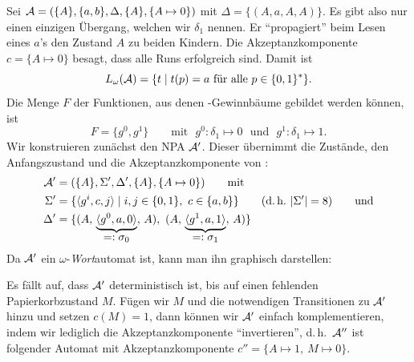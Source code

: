 \documentclass[fontsize=11pt, twoside=false, numbers=autoenddot]{scrbook}
\begin{document}
Sei $\mathcal{A} = (\{A\}, \{a,b\}, \Delta, \{A\}, \{A \mapsto 0\})$
mit $\Delta = \{(A,a,A,A)\}$. Es gibt also nur einen einzigen Übergang,
welchen wir $\delta_1$ nennen. Er "`propagiert"' beim Lesen eines $a$'s
den Zustand $A$ zu beiden Kindern.
Die Akzeptanzkomponente $c = \{A \mapsto 0\}$
besagt, dass alle Runs erfolgreich sind.
Damit ist
\[
  L_\omega(\mathcal{A}) = \{t \mid t(p)=a \text{~für alle~} p \in \{0,1\}^*\}.
\]
Die Menge $F$ der Funktionen, aus denen \PF-Gewinnbäume gebildet werden können,
ist
\[
  F = \{g^0,g^1\}\qquad
  \text{mit~~} g^0 : \delta_1 \mapsto 0
  \text{~~und~~} g^1 : \delta_1 \mapsto 1.
\]
%
Wir konstruieren zunächst den NPA $\mathcal{A}'$. Dieser übernimmt die Zustände, den Anfangszustand
und die Akzeptanzkomponente von \Amc:
%
\begin{align*}
  \mathcal{A}'   & = (\{A\}, \Sigma', \Delta', \{A\}, \{A \mapsto 0\}) \qquad\text{mit} \\
  \Sigma' & = \{\langle g^i, c, j\rangle \mid i,j \in \{0,1\},~ c \in \{a,b\}\}\qquad \text{(d.\,h.\ $|\Sigma'|=8$)}\qquad \text{und} \\
  \Delta' & = \{(A,\,\underbrace{\langle g^0,a,0\rangle}_{\text{{\normalsize $=: \sigma_0$}}},\,A),~ 
                (A,\,\underbrace{\langle g^1,a,1\rangle}_{\text{{\normalsize $=: \sigma_1$}}},\,A)\}
\end{align*}
%
Da $\mathcal{A}'$ ein $\omega$-\emph{Wort}automat ist, kann man ihn graphisch darstellen:
%
\begin{center}
\end{center}
%
Es fällt auf, dass $\mathcal{A}'$ deterministisch ist, bis auf einen fehlenden Papierkorbzustand $M$.
Fügen wir $M$ und die notwendigen Transitionen zu $\mathcal{A}'$ hinzu
und setzen $c(M) = 1$, dann können wir $\mathcal{A}'$ einfach komplementieren,
indem wir lediglich die Akzeptanzkomponente "`invertieren"',
d.\,h.\ $\mathcal{A}''$ ist folgender Automat mit Akzeptanzkomponente $c'' = \{A \mapsto 1,~ M \mapsto 0\}$.
%
\end{document}
